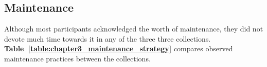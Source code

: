 \subsection{Maintenance}
\label{exp-study:comparison-maintenance}
Although most participants acknowledged the worth of maintenance, they did not devote much time towards it in any of the three three collections.  \textbf{Table~\ref{table:chapter3_maintenance_strategy}} compares observed maintenance practices between the collections.  %

